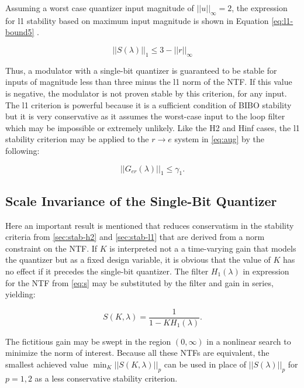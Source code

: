 Assuming a worst case quantizer input magnitude of $||u||_\infty = 2$, the expression for \gls{l1} stability based on maximum input magnitude is shown in Equation \ref{eq:l1-bound5} \cite{Anastassiou1989}.

\begin{equation} 
	 ||S(\lambda)||_1 \leq 3 - ||r||_\infty \label{eq:l1-bound5}
\end{equation}

Thus, a modulator with a single-bit quantizer is guaranteed to be stable for inputs of magnitude less than three minus the \gls{l1} norm of the NTF. If this value is negative, the modulator is not proven stable by this criterion, for any input. The \gls{l1} criterion is powerful because it is a sufficient condition of \gls{BIBO} stability but it is very conservative as it assumes the worst-case input to the loop filter which may be impossible or extremely unlikely. Like the \gls{H2} and \gls{Hinf} cases, the \gls{l1} stability criterion may be applied to the $r \rightarrow e$ system in \autoref{eq:aug} by the following:

\begin{equation}
	||G_{er}(\lambda)||_1 \leq \gamma_1. \label{eq:l1}
\end{equation}

\subsection{Scale Invariance of the Single-Bit Quantizer}
\label{sec:stab-si}

Here an important result is mentioned that reduces conservatism in the stability criteria from \autoref{sec:stab-h2} and \autoref{sec:stab-l1} that are derived from a norm constraint on the \gls{NTF}. If $K$ is interpreted not a a time-varying gain that models the quantizer but as a fixed design variable, it is obvious that the value of $K$ has no effect if it precedes the single-bit quantizer. The filter $H_1(\lambda)$ in expression for the \gls{NTF} from \autoref{eq:s} may be substituted by the filter and gain in series, yielding:

\begin{equation}
	S(K, \lambda) = \frac{1}{1 - KH_1(\lambda)}. \label{eq:scale-invariance}
\end{equation}

The fictitious gain may be swept in the region $(0, \infty)$ in a nonlinear search to minimize the norm of interest. Because all these \gls{NTF}s are equivalent, the smallest achieved value $\min_K ||S(K, \lambda)||_p$ can be used in place of $||S(\lambda)||_p$ for $p = 1, 2$ as a less conservative stability criterion.

